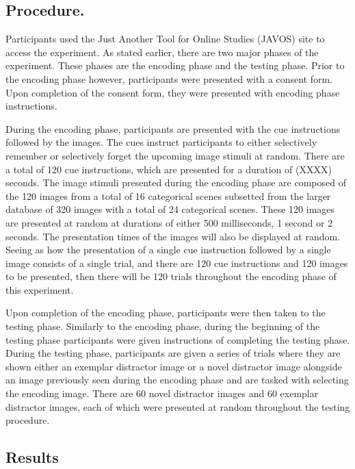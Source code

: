 \documentclass[
  english,
  man,floatsintext]{apa6}
\begin{document}
\hypertarget{procedure.}{%
\subsection{Procedure.}\label{procedure.}}

Participants used the Just Another Tool for Online Studies (JAVOS) site to access the experiment. As stated earlier, there are two major phases of the experiment. These phases are the encoding phase and the testing phase. Prior to the encoding phase however, participants were presented with a consent form. Upon completion of the consent form, they were presented with encoding phase instructions.

During the encoding phase, participants are presented with the cue instructions followed by the images. The cues instruct participants to either selectively remember or selectively forget the upcoming image stimuli at random. There are a total of 120 cue instructions, which are presented for a duration of (XXXX) seconds. The image stimuli presented during the encoding phase are composed of the 120 images from a total of 16 categorical scenes subsetted from the larger database of 320 images with a total of 24 categorical scenes. These 120 images are presented at random at durations of either 500 milliseconds, 1 second or 2 seconds. The presentation times of the images will also be displayed at random. Seeing as how the presentation of a single cue instruction followed by a single image consists of a single trial, and there are 120 cue instructions and 120 images to be presented, then there will be 120 trials throughout the encoding phase of this experiment.

Upon completion of the encoding phase, participants were then taken to the testing phase. Similarly to the encoding phase, during the beginning of the testing phase participants were given instructions of completing the testing phase. During the testing phase, participants are given a series of trials where they are shown either an exemplar distractor image or a novel distractor image alongside an image previously seen during the encoding phase and are tasked with selecting the encoding image. There are 60 novel distractor images and 60 exemplar distractor images, each of which were presented at random throughout the testing procedure.

\hypertarget{results}{%
\subsection{Results}\label{results}}
\end{document}

